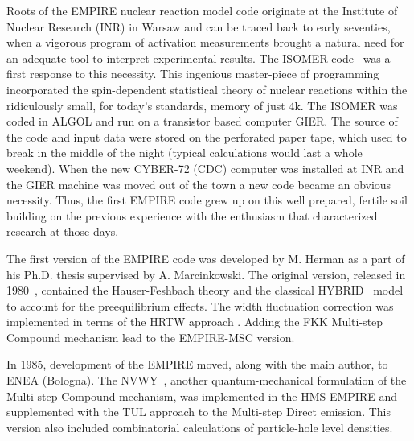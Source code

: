 Roots of the EMPIRE nuclear reaction model code originate at the Institute
of Nuclear Research (INR) in Warsaw and can be traced back to early
seventies, when a vigorous program of activation measurements brought a
natural need for an adequate tool to interpret experimental results. The
ISOMER code~\cite{Grochulski:73} was a first response to this necessity.
This ingenious master-piece of programming incorporated the spin-dependent
statistical theory of nuclear reactions within the ridiculously small, for
today's standards, memory of just 4k. The ISOMER was coded in ALGOL and run
on a transistor based computer GIER. The source of the code and input data
were stored on the perforated paper tape, which used to break in the middle
of the night (typical calculations would last a whole weekend). When the new
CYBER-72 (CDC) computer was installed at INR and the GIER machine was moved
out of the town a new code became an obvious necessity. Thus, the first
EMPIRE code grew up on this well prepared, fertile soil building on the
previous experience with the enthusiasm that characterized research at those
days.

The first version of the EMPIRE code was developed by M. Herman as a part of
his Ph.D. thesis supervised by A. Marcinkowski. The original version,
released in 1980~\cite{EMPIRE-I}, contained the Hauser-Feshbach theory and
the classical HYBRID~\cite{hybrid, hybrid1, hybrid2, hybrid3} model to
account for the preequilibrium effects. The width fluctuation correction was
implemented in terms of the HRTW approach \cite{HRTW,HHM}. Adding the FKK
Multi-step Compound mechanism \cite{FKK} lead to the EMPIRE-MSC version.

In 1985, development of the EMPIRE moved, along with the main author, to
ENEA (Bologna). The NVWY~\cite{NVWY}, another quantum-mechanical formulation
of the Multi-step Compound mechanism, was implemented in the HMS-EMPIRE and
supplemented with the TUL approach\cite{TUL} to the Multi-step Direct
emission. This version also included combinatorial calculations of
particle-hole level densities.

